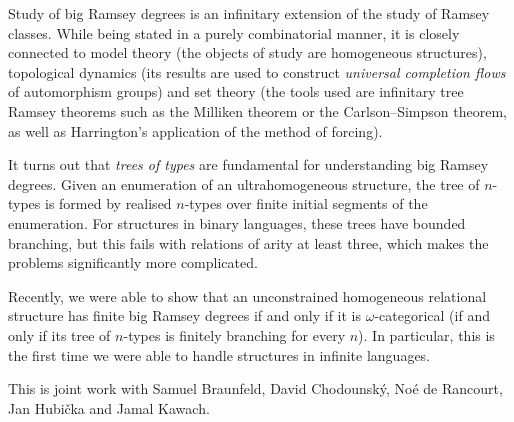 \documentclass[bsl,meeting]{asl}
\begin{document}
Study of big Ramsey degrees is an infinitary extension of the study of Ramsey classes. While being stated in a purely combinatorial manner, it is closely connected to model theory (the objects of study are homogeneous structures), topological dynamics (its results are used to construct \emph{universal completion flows} of automorphism groups) and set theory (the tools used are infinitary tree Ramsey theorems such as the Milliken theorem or the Carlson--Simpson theorem, as well as Harrington's application of the method of forcing).

It turns out that \emph{trees of types} are fundamental for understanding big Ramsey degrees. Given an enumeration of an ultrahomogeneous structure, the tree of $n$-types is formed by realised $n$-types over finite initial segments of the enumeration. For structures in binary languages, these trees have bounded branching, but this fails with relations of arity at least three, which makes the problems significantly more complicated.

Recently, we were able to show that an unconstrained homogeneous relational structure has finite big Ramsey degrees if and only if it is $\omega$-categorical (if and only if its tree of $n$-types is finitely branching for every $n$). In particular, this is the first time we were able to handle structures in infinite languages.

This is joint work with Samuel Braunfeld, David Chodounsk\'y, No\'e de Rancourt, Jan Hubi\v{c}ka and Jamal Kawach.
\end{document}
